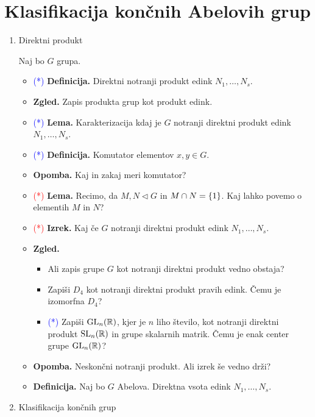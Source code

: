 \section{Klasifikacija končnih Abelovih grup}
\begin{enumerate}
    \item Direktni produkt

    Naj bo \(G\) grupa.
    \begin{itemize}
        \item \textcolor{blue}{(*)} \textbf{Definicija.} Direktni notranji produkt edink \(N_1, \ldots, N_s\).
        \item \textbf{Zgled.} Zapis produkta grup kot produkt edink.
        \item \textcolor{blue}{(*)} \textbf{Lema.} Karakterizacija kdaj je \(G\) notranji direktni produkt edink \(N_1, \ldots, N_s\).
        \item \textcolor{blue}{(*)} \textbf{Definicija.} Komutator elementov \(x, y \in G\).
        \item \textbf{Opomba.} Kaj in zakaj meri komutator?
        \item \textcolor{red}{(*)} \textbf{Lema.} Recimo, da \(M, N \triangleleft G\) in \(M \cap N = \{1\}\). Kaj lahko povemo o elementih \(M\) in \(N\)?
        \item \textcolor{red}{(*)} \textbf{Izrek.} Kaj če \(G\) notranji direktni produkt edink \(N_1, \ldots, N_s\).
        \item \textbf{Zgled.} \
        \begin{itemize}
            \item Ali zapis grupe \(G\) kot notranji direktni produkt vedno obstaja?
            \item Zapiši \(D_4\) kot notranji direktni produkt pravih edink. Čemu je izomorfna \(D_4\)?
            \item \textcolor{blue}{(*)} Zapiši \(\operatorname{GL}_n(\mathbb{R})\), kjer je \(n\) liho število, kot notranji direktni produkt \(\operatorname{SL}_n(\mathbb{R})\) in grupe skalarnih matrik. Čemu je enak center grupe \(\operatorname{GL}_n(\mathbb{R})\)?
        \end{itemize}
        \item \textbf{Opomba.} Neskončni notranji produkt. Ali izrek še vedno drži?
        \item \textbf{Definicija.} Naj bo \(G\) Abelova. Direktna vsota edink \(N_1, \ldots, N_s\).
    \end{itemize}

    \item Klasifikacija končnih grup
    

\end{enumerate}
